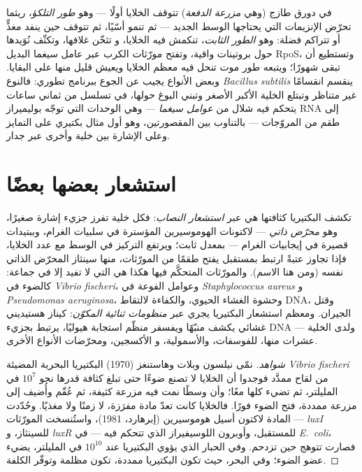 \begin{definition}\label{def:b3:bacteriology:phases}
في دورق طازج (وهي \emph{مزرعة الدفعة}) تتوقف الخلايا أولًا --- وهو
\emph{طور التلكؤ}، ريثما تحرّض الإنزيمات التي يحتاجها الوسط الجديد
--- ثم تنمو أسّيًا، ثم تتوقف حين ينفد مغذٍّ أو
تتراكم فضلة: وهو \emph{الطور الثابت}، تنكمش فيه الخلايا، و
تثخّن غلافها، وتكثّف نُوَيدها حول بروتينات
واقية، وتفتح مورّثات الكرب عبر عامل سيغما
البديل RpoS، وتستطيع أن تبقى شهورًا؛ ويتبعه طور موت
تنحل فيه معظم الخلايا ويعيش قليل منها على البقايا. وبعض الأنواع
يجيب عن الجوع ببرنامج تطوري: فالنوع \emph{Bacillus
subtilis} ينقسم انقسامًا غير متناظر وتبتلع الخلية الأكبر
الأصغر وتبني البوغ حولها، في تسلسل من ثماني ساعات
يتحكم فيه شلال من \emph{عوامل سيغما} --- وهي الوحدات التي
توجّه بوليميراز RNA إلى طقم من المروّجات --- بالتناوب بين
المقصورتين، وهو أول مثال بكتيري على التمايز
وعلى الإشارة بين خلية وأخرى عبر جدار.
\end{definition}

\section{استشعار بعضها بعضًا}

\begin{definition}\label{def:b3:bacteriology:quorum}
تكشف البكتيريا كثافتها هي عبر \emph{استشعار النصاب}: فكل خلية
تفرز جزيء إشارة صغيرًا، وهو \emph{محرّض ذاتي} --- لاكتونات
الهوموسيرين المؤسترة في سلبيات الغرام، وببتيدات قصيرة في إيجابيات الغرام
--- بمعدل ثابت؛ ويرتفع التركيز في الوسط مع
عدد الخلايا، فإذا تجاوز عتبةً ارتبط بمستقبل
يفتح طقمًا من المورّثات، منها سينثاز
المحرّض الذاتي نفسه (ومن هنا الاسم). والمورّثات المتحكَّم فيها هكذا هي
التي لا تفيد إلا في جماعة: كالضوء في \emph{Vibrio fischeri}،
وعوامل الفوعة في \emph{Staphylococcus aureus} و
\emph{Pseudomonas aeruginosa}، وحشوة الغشاء الحيوي، والكفاءة لالتقاط
DNA، وقتل الجيران. ومعظم استشعار البكتيريا يجري
عبر \emph{منظومات ثنائية المكوّن}: كيناز هستيديني غشائي
يكشف منبّهًا ويفسفر منظّم استجابة هيوليًا،
يرتبط بجزيء DNA --- ولدى الخلية عشرات منها، للفوسفات، والأسمولية، و
الأكسجين، ومحرّضات الأنواع الأخرى.
\end{definition}

\begin{proof}[شواهد]
نمّى نيلسون وبلات وهاستنغز (1970) البكتيريا البحرية المضيئة
\emph{Vibrio fischeri} من لقاح ممدَّد فوجدوا أن الخلايا
لا تصنع ضوءًا حتى تبلغ كثافة قدرها نحو $10^{7}$ في
المليلتر، ثم تضيء كلها معًا؛ وأن وسطًا نمت فيه مزرعة كثيفة،
ثم عُقّم وأُضيف إلى مزرعة ممددة، فتح الضوء
فورًا. فالخلايا كانت تعدّ مادة مفرَزة، لا زمنًا ولا
مغذيًا. وحُدّدت المادة لاكتون أسيل هوموسيرين
(إبرهارد، 1981)، واستُنسخت المورّثات --- \emph{luxI} للسينثاز، و
\emph{luxR} للمستقبل، وأوبرون اللوسيفيراز الذي تتحكم فيه ---
في \emph{E.~coli}، فصارت تتوهج حين تزدحم. وفي
الحبار الذي يؤوي البكتيريا عند $10^{10}$ في المليلتر، يضيء
عضو الضوء؛ وفي البحر، حيث تكون البكتيريا ممددة، تكون
مظلمة وتوفّر الكلفة.
\end{proof}

